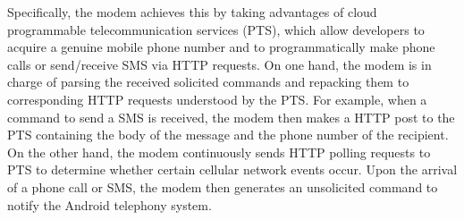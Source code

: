 \documentclass[conference]{IEEEtranl}
\begin{document}
	Specifically, the modem achieves this by taking advantages of cloud programmable telecommunication services (PTS), which allow developers to acquire a genuine mobile phone number and to programmatically make phone calls or send/receive SMS via HTTP requests.
	On one hand, the modem is in charge of parsing the received solicited commands and repacking them to corresponding HTTP requests understood by the PTS. For example, when a command to send a SMS is received, the modem then makes a HTTP post to the PTS containing the body of the message and the phone number of the recipient.
	On the other hand, the modem continuously sends HTTP polling requests to PTS to determine whether certain cellular network events occur. Upon the arrival of a phone call or SMS, the modem then generates an unsolicited command to notify the Android telephony system.  









\end{document}
